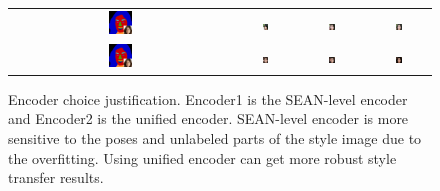 \begin{figure}[th]
\begin{tabular} {cc|cc}
\includegraphics[width=0.11\textwidth]{Images/Encoder_search/encoder_2.png} & \includegraphics[width=0.11\textwidth]{Images/Encoder_search/style/29573.png} &
\includegraphics[width=0.11\textwidth]{Images/Encoder_search/SEAN_level/3.png} &   \includegraphics[width=0.11\textwidth]{Images/Encoder_search/Unified/3.png}\\ 

\includegraphics[width=0.11\textwidth]{Images/Encoder_search/encoder_2.png} & \includegraphics[width=0.11\textwidth]{Images/Encoder_search/style/29659.png} &
\includegraphics[width=0.11\textwidth]{Images/Encoder_search/SEAN_level/4.png} &   \includegraphics[width=0.11\textwidth]{Images/Encoder_search/Unified/4.png}\\ 


\end{tabular}
\vspace{-2mm}
	\caption{Encoder choice justification. Encoder1 is the SEAN-level encoder and Encoder2 is the unified encoder. SEAN-level encoder is more sensitive to the poses and unlabeled parts of the style image due to the overfitting. Using unified encoder can get more robust style transfer results.}
	\label{fig:Encoder Comparison}	
\vspace{-3mm}	
 \end{figure}
 \egroup
 \addtolength{\tabcolsep}{4.5pt}